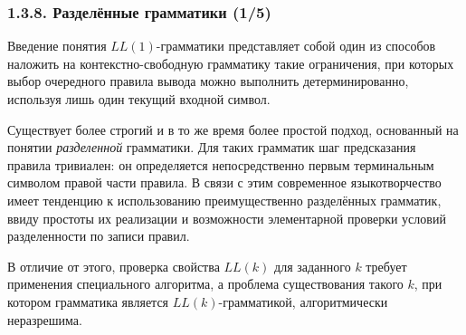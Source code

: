 \documentclass[mathserif,12pt,aspectratio=169]{beamer}
\def\emразделенной{\em разделенной}
\def\em#1{\it\color{blue}#1}
\begin{document}
\begin{frame}
\frametitle{1.3.8. Разделённые грамматики (1/5)}
Введение понятия $ LL(1) $-грамматики представляет собой один из способов наложить на контекстно-свободную грамматику такие ограничения, при которых выбор очередного правила вывода можно выполнить детерминированно, используя лишь один текущий входной символ.

\smallskip

Существует более строгий и в то же время более простой подход, основанный на понятии {\emразделенной} грамматики. 
Для таких грамматик шаг предсказания правила тривиален: он определяется непосредственно первым терминальным символом правой части правила. В связи с этим современное языкотворчество имеет тенденцию к использованию преимущественно разделённых грамматик,
ввиду простоты их реализации и возможности элементарной проверки условий разделенности по записи правил.

\smallskip

В отличие от этого, проверка свойства $ LL(k) $ для заданного $  k  $ требует применения специального алгоритма, а проблема существования такого $ k $, при котором грамматика является $ LL(k) $-грамматикой, алгоритмически неразрешима.


\end{frame}
\end{document}
